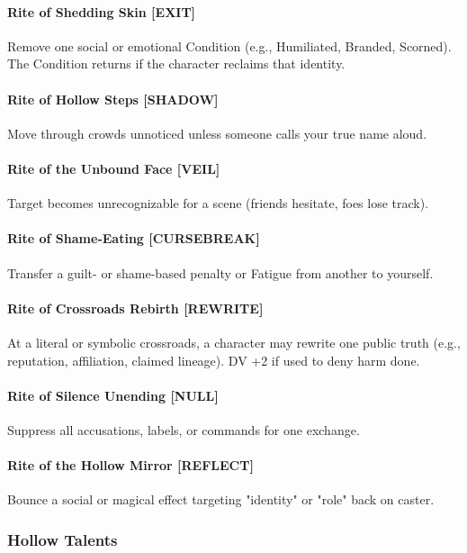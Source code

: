 \documentclass[11pt]{book}
\begin{document}
    \paragraph{Rite of Shedding Skin [EXIT]}
Remove one social or emotional Condition (e.g., Humiliated, Branded, Scorned).  
The Condition returns if the character reclaims that identity.

\paragraph{Rite of Hollow Steps [SHADOW]}
Move through crowds unnoticed unless someone calls your true name aloud.

\paragraph{Rite of the Unbound Face [VEIL]}
Target becomes unrecognizable for a scene (friends hesitate, foes lose track).

\paragraph{Rite of Shame-Eating [CURSEBREAK]}
Transfer a guilt- or shame-based penalty or Fatigue from another to yourself.

\paragraph{Rite of Crossroads Rebirth [REWRITE]}
At a literal or symbolic crossroads, a character may rewrite one public truth  
(e.g., reputation, affiliation, claimed lineage).  
DV +2 if used to deny harm done.

\paragraph{Rite of Silence Unending [NULL]}
Suppress all accusations, labels, or commands for one exchange.

\paragraph{Rite of the Hollow Mirror [REFLECT]}
Bounce a social or magical effect targeting "identity" or "role" back on caster.

\subsubsection*{Hollow Talents}
\end{document}
